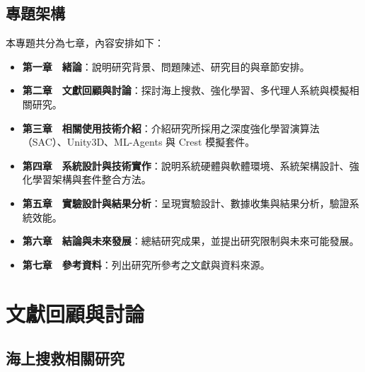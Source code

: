\documentclass[12pt,a4paper]{article}
\begin{document}
\subsection{專題架構}
本專題共分為七章，內容安排如下：

\begin{itemize}
\item \textbf{第一章　緒論}：說明研究背景、問題陳述、研究目的與章節安排。
\item \textbf{第二章　文獻回顧與討論}：探討海上搜救、強化學習、多代理人系統與模擬相關研究。
\item \textbf{第三章　相關使用技術介紹}：介紹研究所採用之深度強化學習演算法（SAC）、Unity3D、ML-Agents 與 Crest 模擬套件。
\item \textbf{第四章　系統設計與技術實作}：說明系統硬體與軟體環境、系統架構設計、強化學習架構與套件整合方法。
\item \textbf{第五章　實驗設計與結果分析}：呈現實驗設計、數據收集與結果分析，驗證系統效能。
\item \textbf{第六章　結論與未來發展}：總結研究成果，並提出研究限制與未來可能發展。
\item \textbf{第七章　參考資料}：列出研究所參考之文獻與資料來源。
\end{itemize}

\newpage

\section{文獻回顧與討論}

\subsection{海上搜救相關研究}
\end{document}
